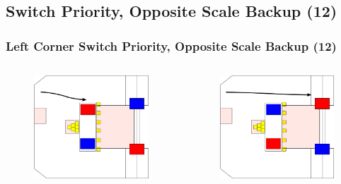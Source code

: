 \documentclass{beamer}
\begin{document}
\subsection{Switch Priority, Opposite Scale Backup (12)}

\begin{frame}
 \frametitle{Left Corner Switch Priority, Opposite Scale Backup \alert{(12)}}
 \begin{columns}
  \begin{figure}
   \includegraphics[scale=0.15]{assets/paths/12_LR}
  \end{figure}
  \begin{figure}
   \includegraphics[scale=0.15]{assets/paths/12_RL}

\end{figure}
\end{columns}
\end{frame}
\end{document}
